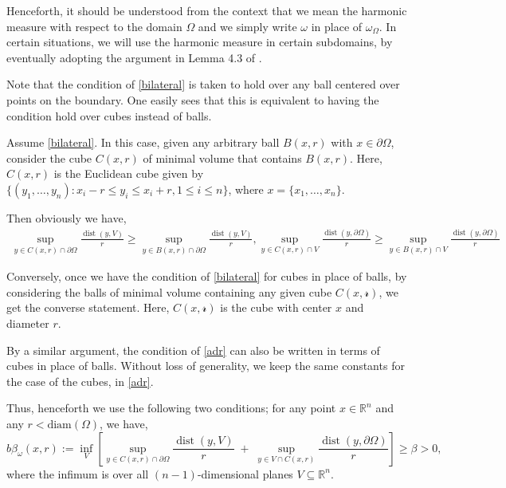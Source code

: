 \documentclass{article}
\theoremstyle{plain}
\theoremstyle{plain}
\newcommand{\R}{\mathbb{R}}
\theoremstyle{definition}
\theoremstyle{plain}
\begin{document}
Henceforth, it should be understood from the context that we mean the harmonic measure with respect to the domain $\Omega$ and we simply write $\omega$ in place of $\omega_\Omega$.  In certain situations, we will use the harmonic measure in certain subdomains, by eventually adopting the argument in Lemma 4.3 of \cite{Az20}.

Note that the condition of \cref{bilateral} is taken to hold over any ball centered over points on the boundary. One easily sees that this is equivalent to having the condition hold over cubes instead of balls. 

Assume \cref{bilateral}. In this case, given any arbitrary ball $B(x,r)$ with $x\in \partial\Omega$, consider the cube $C(x,r)$ of minimal volume that contains $B(x,r)$. Here, $C(x,r)$ is the Euclidean cube given by $\{(y_1,\dots,y_n):x_i -r\leq y_i\leq x_i +r , 1\leq i\leq n\}$, where $x=\{x_1,\dots,x_n\}$.


Then obviously we have,
\begin{align}
    \sup_{y \in C(x,r)\cap \partial \Omega} \frac{\operatorname{dist}(y,V)}{r} \geq  \sup_{y \in B(x,r)\cap \partial \Omega} \frac{\operatorname{dist}(y,V)}{r}, \sup_{y \in C(x,r)\cap V} \frac{\operatorname{dist}(y,\partial\Omega)}{r} \geq  \sup_{y \in B(x,r)\cap V} \frac{\operatorname{dist}(y,\partial\Omega)}{r}
\end{align}

Conversely, once we have the condition of \cref{bilateral} for cubes in place of balls, by considering the balls of minimal volume containing any given cube $C(x,\mathscr{r})$, we get the converse statement. Here, $C(x,\mathscr{r})$ is the cube with center $x$ and diameter $r$.

By a similar argument, the condition of \cref{adr} can also be written in terms of cubes in place of balls. Without loss of generality, we keep the same constants for the case of the cubes, in \cref{adr}.

Thus, henceforth we use the following two conditions; for any point $x\in \R^n$ and any $r< \text{diam}(\Omega)$, we have,
\begin{equation}\label{bilateral'}\tag{1'}
b\beta_{\omega}(x,r)
:= \inf_{V}\left[
\sup_{y \in C(x,r)\cap \partial \Omega} \frac{\operatorname{dist}(y,V)}{r}
\;+\;
\sup_{y\in V\cap C(x,r)} \frac{\operatorname{dist}(y,\partial\Omega)}{r}
\right]
\ge \beta > 0,
\end{equation}
where the infimum is over all $(n-1)$-dimensional planes $V \subseteq \mathbb{R}^{n}$.
 
\end{document}

